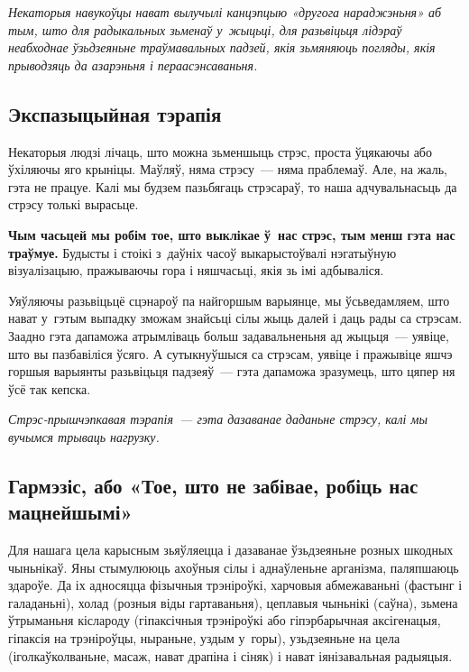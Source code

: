 
\emph{Некаторыя навукоўцы нават вылучылі канцэпцыю «другога нараджэньня» аб тым, што для радыкальных зьменаў у~жыцьці, для разьвіцьця лідэраў неабходнае ўзьдзеяньне траўмавальных падзей, якія зьмяняюць погляды, якія прыводзяць да азарэньня і пераасэнсаваньня.}

\subsection*{Экспазыцыйная тэрапія}

Некаторыя людзі лічаць, што можна зьменшыць стрэс, проста ўцякаючы або ўхіляючы яго крыніцы. Маўляў, няма стрэсу~--- няма праблемаў. Але, на жаль, гэта не працуе. Калі мы будзем пазьбягаць стрэсараў, то наша адчувальнасьць да стрэсу толькі вырасьце. 

\textbf{Чым часьцей мы робім тое, што выклікае ў~нас стрэс, тым менш гэта нас траўмуе.} Будысты і стоікі з~даўніх часоў выкарыстоўвалі нэгатыўную візуалізацыю, пражываючы гора і няшчасьці, якія зь імі адбываліся.

Уяўляючы разьвіцьцё сцэнароў па найгоршым варыянце, мы ўсьведамляем, што нават у~гэтым выпадку зможам знайсьці сілы жыць далей і даць рады са стрэсам. Заадно гэта дапаможа атрымліваць больш задавальненьня ад жыцьця~--- уявіце, што вы пазбавіліся ўсяго. А сутыкнуўшыся са стрэсам, уявіце і пражывіце яшчэ горшыя варыянты разьвіцьця падзеяў~--- гэта дапаможа зразумець, што цяпер ня ўсё так кепска. 

\emph{Стрэс-прышчэпкавая тэрапія~--- гэта дазаванае даданьне стрэсу, калі мы вучымся трываць нагрузку.}

\subsection*{Гармэзіс, або «Тое, што не забівае, робіць нас мацнейшымі»}

Для нашага цела карысным зьяўляецца і дазаванае ўзьдзеяньне розных шкодных чыньнікаў. Яны стымулююць ахоўныя сілы і аднаўленьне арганізма, паляпшаюць здароўе. Да іх адносяцца фізычныя трэніроўкі, харчовыя абмежаваньні (фастынг і галаданьні), холад (розныя віды гартаваньня), цеплавыя чыньнікі (саўна), зьмена ўтрыманьня кіслароду (гіпаксічныя трэніроўкі або гіпэрбарычная аксігенацыя, гіпаксія на трэніроўцы, ныраньне, уздым у~горы), узьдзеяньне на цела (іголкаўколваньне, масаж, нават драпіна і сіняк) і нават іянізавальная радыяцыя.

